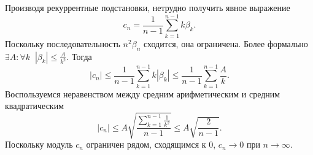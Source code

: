 \documentclass{article}
\begin{document}
Производя рекуррентные подстановки, нетрудно получить явное выражение $$c_n = \frac{1}{n-1} \sum\limits_{k=1}^{n-1} k \beta_{k}.$$
Поскольку последовательность $n^2 \beta_n$ сходится, она ограничена. Более формально $\exists A: \forall k \;\; |\beta_k| \leqslant \frac{A}{k^2}$. Тогда
$$|c_n| \leqslant \frac{1}{n-1} \sum\limits_{k=1}^{n-1} k |\beta_{k}| \leqslant \frac{1}{n-1} \sum_{k=1}^{n-1} \frac{A}{k}.$$
Воспользуемся неравенством между средним арифметическим и средним квадратическим
$$|c_n| \leqslant A \sqrt{\frac{\sum\limits_{k=1}^{n-1} \frac{1}{k^2}}{n-1}} \leqslant A \sqrt{\frac{2}{n-1}}.$$
Поскольку модуль $c_n$ ограничен рядом, сходящимся к $0$, $c_n \to 0$ при $n \to \infty$.
\end{document}
